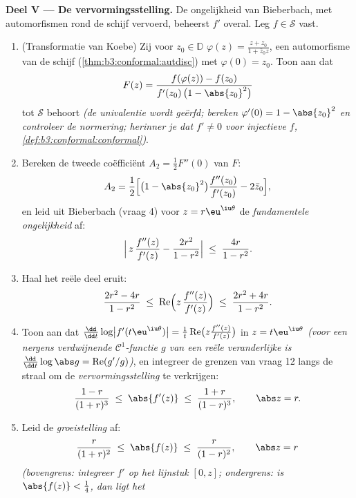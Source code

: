\begin{problem}
\medskip
\noindent\textbf{Deel V --- De vervormingsstelling.} De
ongelijkheid van Bieberbach, met automorfismen rond de schijf
vervoerd, beheerst $f'$ overal. Leg $f \in \mathcal S$ vast.
\begin{enumerate}[resume]
  \item (Transformatie van Koebe) Zij voor $z_0 \in \mathbb D$
        $\varphi(z) = \frac{z + z_0}{1 + \bar z_0z}$, een
        automorfisme van de schijf
        (\cref{thm:b3:conformal:autdisc}) met $\varphi(0) = z_0$.
        Toon aan dat
        \[
        F(z) = \frac{f(\varphi(z)) - f(z_0)}
        {f'(z_0)\,\bigl(1 - \abs{z_0}^2\bigr)}
        \]
        tot $\mathcal S$ behoort \emph{(de univalentie wordt
        geërfd; bereken $\varphi'(0) = 1 - \abs{z_0}^2$ en
        controleer de normering; herinner je dat $f' \neq 0$ voor
        injectieve $f$, \cref{def:b3:conformal:conformal})}.
  \item Bereken de tweede coëfficiënt $A_2 = \frac12F''(0)$ van
        $F$:
        \[
        A_2 = \frac12\Bigl[\bigl(1 - \abs{z_0}^2\bigr)
        \frac{f''(z_0)}{f'(z_0)} - 2\bar z_0\Bigr] ,
        \]
        en leid uit Bieberbach (vraag 4) voor $z =
        r\eu^{\iu\theta}$ de \emph{fundamentele ongelijkheid} af:
        \[
        \Bigl|\,z\,\frac{f''(z)}{f'(z)} -
        \frac{2r^2}{1 - r^2}\Bigr|
        \;\leq\; \frac{4r}{1 - r^2} .
        \]
  \item Haal het reële deel eruit:
        \[
        \frac{2r^2 - 4r}{1 - r^2} \;\leq\;
        \operatorname{Re}\Bigl(z\,\frac{f''(z)}{f'(z)}\Bigr)
        \;\leq\; \frac{2r^2 + 4r}{1 - r^2} .
        \]
  \item Toon aan dat $\frac{\dd}{\dd t}\log\bigl|
        f'(t\eu^{\iu\theta})\bigr| = \frac1t
        \operatorname{Re}\bigl(z\frac{f''(z)}{f'(z)}\bigr)$ in $z
        = t\eu^{\iu\theta}$ \emph{(voor een nergens verdwijnende
        $\mathcal C^1$-functie $g$ van een reële veranderlijke is
        $\frac{\dd}{\dd t}\log\abs g = \operatorname{Re}(g'/g)$)},
        en integreer de grenzen van vraag 12 langs de straal om
        de \emph{vervormingsstelling} te verkrijgen:
        \[
        \frac{1 - r}{(1 + r)^3} \;\leq\; \abs{f'(z)}
        \;\leq\; \frac{1 + r}{(1 - r)^3},
        \qquad \abs z = r .
        \]
  \item Leid de \emph{groeistelling} af:
        \[
        \frac{r}{(1 + r)^2} \;\leq\; \abs{f(z)} \;\leq\;
        \frac{r}{(1 - r)^2},
        \qquad \abs z = r
        \]
        \emph{(bovengrens: integreer $f'$ op het lijnstuk $[0,
        z]$; ondergrens: is $\abs{f(z)} < \frac14$, dan ligt het
}
\end{enumerate}
\end{problem}
